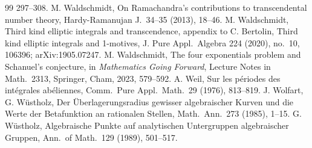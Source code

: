 \documentclass[11pt]{amsart}
\theoremstyle{definition}
\begin{document}
\begin{thebibliography}{99}
297--308.
 M. Waldschmidt, On Ramachandra's contributions to transcendental number theory, Hardy-Ramanujan J.\ 34--35
(2013), 18--46.
 M. Waldschmidt, Third kind elliptic integrals and transcendence, appendix to C. Bertolin, Third kind
elliptic integrals and 1-motives, J. Pure Appl.\ Algebra 224 (2020), no.~10, 106396; arXiv:1905.07247.
 M. Waldschmidt, The four exponentials problem and Schanuel's conjecture, in \emph{Mathematics Going
Forward}, Lecture Notes in Math.\ 2313, Springer, Cham, 2023, 579--592.
 A. Weil, Sur les p\'eriodes des int\'egrales ab\'eliennes, Comm.\ Pure Appl.\ Math.\ 29 (1976), 813--819.
 J. Wolfart, G. W\"ustholz, Der \"Uberlagerungsradius gewisser algebraischer Kurven und die Werte der
Betafunktion an rationalen Stellen, Math.\ Ann.\ 273 (1985), 1--15.
 G. W\"ustholz, Algebraische Punkte auf analytischen Untergruppen algebraischer Gruppen, Ann.\ of Math.\ 129
(1989), 501--517.
\end{thebibliography}
\end{document}
